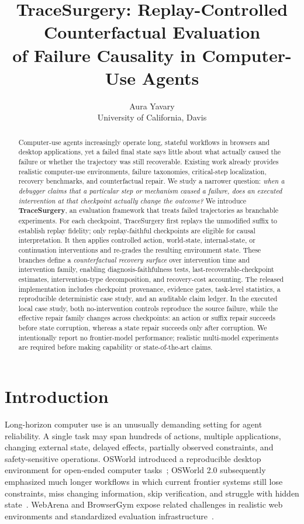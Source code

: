 \documentclass{article}
\title{TraceSurgery: Replay-Controlled Counterfactual Evaluation\\of Failure Causality in Computer-Use Agents}
\author{
  Aura Yavary \\
  University of California, Davis
}
\begin{document}
\maketitle

\begin{abstract}
Computer-use agents increasingly operate long, stateful workflows in browsers and desktop applications, yet a failed final state says little about what actually caused the failure or whether the trajectory was still recoverable. Existing work already provides realistic computer-use environments, failure taxonomies, critical-step localization, recovery benchmarks, and counterfactual repair. We study a narrower question: \emph{when a debugger claims that a particular step or mechanism caused a failure, does an executed intervention at that checkpoint actually change the outcome?} We introduce \textbf{TraceSurgery}, an evaluation framework that treats failed trajectories as branchable experiments. For each checkpoint, TraceSurgery first replays the unmodified suffix to establish replay fidelity; only replay-faithful checkpoints are eligible for causal interpretation. It then applies controlled action, world-state, internal-state, or continuation interventions and re-grades the resulting environment state. These branches define a \emph{counterfactual recovery surface} over intervention time and intervention family, enabling diagnosis-faithfulness tests, last-recoverable-checkpoint estimates, intervention-type decomposition, and recovery-cost accounting. The released implementation includes checkpoint provenance, evidence gates, task-level statistics, a reproducible deterministic case study, and an auditable claim ledger. In the executed local case study, both no-intervention controls reproduce the source failure, while the effective repair family changes across checkpoints: an action or suffix repair succeeds before state corruption, whereas a state repair succeeds only after corruption. We intentionally report no frontier-model performance; realistic multi-model experiments are required before making capability or state-of-the-art claims.
\end{abstract}

\section{Introduction}

Long-horizon computer use is an unusually demanding setting for agent reliability. A single task may span hundreds of actions, multiple applications, changing external state, delayed effects, partially observed constraints, and safety-sensitive operations. OSWorld introduced a reproducible desktop environment for open-ended computer tasks~\citep{xie2024osworld}; OSWorld 2.0 subsequently emphasized much longer workflows in which current frontier systems still lose constraints, miss changing information, skip verification, and struggle with hidden state~\citep{yuan2026osworld2}. WebArena and BrowserGym expose related challenges in realistic web environments and standardized evaluation infrastructure~\citep{zhou2023webarena,dechezelles2025browsergym}.
\end{document}
